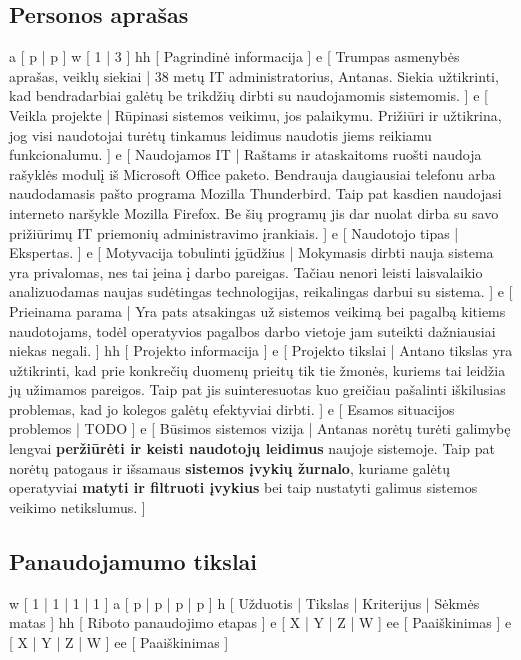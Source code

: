 \subsection{Personos aprašas}
\xtableu
{
  a [ p | p ]
  w [ 1 | 3 ]
  hh [ Pagrindinė informacija ]
  e [ Trumpas asmenybės aprašas, veiklų siekiai
  |
    38 metų IT administratorius, Antanas. Siekia užtikrinti, kad
    bendradarbiai galėtų be trikdžių dirbti su naudojamomis
    sistemomis.
  ]
  e [ Veikla projekte
  |
    Rūpinasi sistemos veikimu, jos palaikymu. Prižiūri ir užtikrina, jog visi naudotojai
    turėtų tinkamus leidimus naudotis jiems reikiamu funkcionalumu.
  ]
  e [ Naudojamos IT
  |
    Raštams ir ataskaitoms ruošti naudoja rašyklės modulį iš
    Microsoft Office paketo. Bendrauja daugiausiai telefonu arba
    naudodamasis pašto programa Mozilla Thunderbird. Taip pat kasdien
    naudojasi interneto naršykle Mozilla Firefox. Be šių programų
    jis dar nuolat dirba su savo prižiūrimų IT priemonių administravimo 
    įrankiais.
  ]
  e [ Naudotojo tipas
  |
    Ekspertas.
  ]
  e [ Motyvacija tobulinti įgūdžius
  |
    Mokymasis dirbti nauja sistema yra privalomas, nes tai įeina į darbo pareigas. Tačiau nenori
    leisti laisvalaikio analizuodamas naujas sudėtingas technologijas, reikalingas darbui su sistema.
  ]
  e [ Prieinama parama
  |
    Yra pats atsakingas už sistemos veikimą bei pagalbą kitiems naudotojams, todėl operatyvios pagalbos
    darbo vietoje jam suteikti dažniausiai niekas negali.
  ]
  hh [ Projekto informacija ]
  e [ Projekto tikslai
  |
    Antano tikslas yra užtikrinti, kad prie konkrečių duomenų prieitų
    tik tie žmonės, kuriems tai leidžia jų užimamos pareigos. Taip
    pat jis suinteresuotas kuo greičiau pašalinti iškilusias problemas,
    kad jo kolegos galėtų efektyviai dirbti.
  ]
  e [ Esamos situacijos problemos
  |
    TODO
  ]
  e [ Būsimos sistemos vizija
  |
    Antanas norėtų turėti galimybę lengvai \textbf{peržiūrėti ir
    keisti naudotojų leidimus} naujoje sistemoje. Taip pat norėtų
    patogaus ir išsamaus \textbf{sistemos įvykių žurnalo}, kuriame
    galėtų operatyviai \textbf{matyti ir filtruoti įvykius} bei taip
    nustatyti galimus sistemos veikimo netikslumus.
  ]
}

\subsection{Panaudojamumo tikslai}
\xtable
{
  w [ 1 | 1 | 1 | 1 ]
  a [ p | p | p | p ]
  h [ Užduotis | Tikslas | Kriterijus | Sėkmės matas ]
  hh [ Riboto panaudojimo etapas ]
  e [ X | Y | Z | W ]
  ee [ Paaiškinimas ]
  e [ X | Y | Z | W ]
  ee [ Paaiškinimas ]
}
